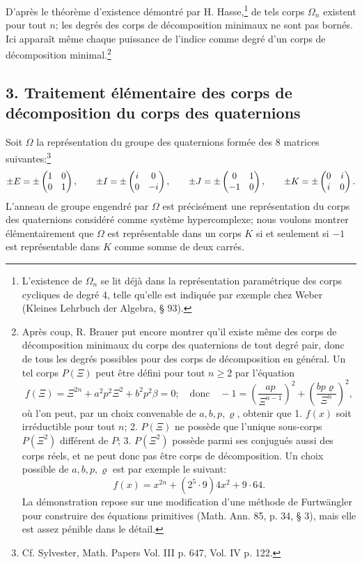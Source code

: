 D'après le théorème d'existence démontré par H. Hasse,\footnote{L'existence de $\Omega_n$ se lit déjà dans la représentation paramétrique des corps cycliques de degré 4, telle qu'elle est indiquée par exemple chez Weber (Kleines Lehrbuch der Algebra, \S{} 93).} de tels corps $\Omega_n$ existent pour tout $n$; les degrés des corps de décomposition minimaux ne sont pas bornés. Ici apparaît même chaque puissance de l'indice comme degré d'un corps de décomposition minimal.\footnote{Après coup, R. Brauer put encore montrer qu'il existe même des corps de décomposition minimaux du corps des quaternions de tout degré pair, donc de tous les degrés possibles pour des corps de décomposition en général. Un tel corps $P(\Xi)$ peut être défini pour tout $n\ge2$ par l'équation
\[
 f(\Xi)=\Xi^{2n}+a^2p^2\Xi^2+b^2p^2\beta=0;
 \quad \text{donc}\quad -1=\left(\frac{ap}{\Xi^{n-1}}\right)^2+
       \left(\frac{bp\varrho}{\Xi^n}\right)^2,
\]
où l'on peut, par un choix convenable de $a,b,p,\varrho$, obtenir que 1. $f(x)$ soit irréductible pour tout $n$; 2. $P(\Xi)$ ne possède que l'unique sous-corps $P(\Xi^2)$ différent de $P$; 3. $P(\Xi^2)$ possède parmi ses conjugués aussi des corps réels, et ne peut donc pas être corps de décomposition. Un choix possible de $a,b,p,\varrho$ est par exemple le suivant:
\[
        f(x)=x^{2n}+(2^5\cdot9)4x^2+9\cdot64.
\]
La démonstration repose sur une modification d'une méthode de Furtwängler pour construire des équations primitives (Math. Ann. 85, p. 34, \S{} 3), mais elle est assez pénible dans le détail.}

\subsection*{3. Traitement élémentaire des corps de décomposition du corps des quaternions}

Soit $\Omega$ la représentation du groupe des quaternions formée des 8 matrices suivantes:\footnote{Cf. Sylvester, Math. Papers Vol. III p. 647, Vol. IV p. 122.}
\[
\pm E=\pm\begin{pmatrix}1&0\\0&1\end{pmatrix},\qquad
\pm I=\pm\begin{pmatrix}i&0\\0&-i\end{pmatrix},\qquad
\pm J=\pm\begin{pmatrix}0&1\\-1&0\end{pmatrix},\qquad
\pm K=\pm\begin{pmatrix}0&i\\ i&0\end{pmatrix}.
\]
L'anneau de groupe engendré par $\Omega$ est précisément une représentation du corps des quaternions considéré comme système hypercomplexe; nous voulons montrer élémentairement que $\Omega$ est représentable dans un corps $K$ si et seulement si $-1$ est représentable dans $K$ comme somme de deux carrés.

